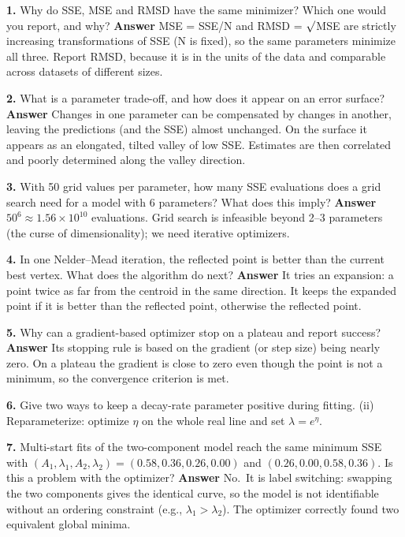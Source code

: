 \textbf{1.} Why do SSE, MSE and RMSD have the same minimizer? Which one
would you report, and why? \textbf{Answer} MSE = SSE/N and RMSD = \ensuremath{\surd}MSE
are strictly increasing transformations of SSE (N is fixed), so the same
parameters minimize all three. Report RMSD, because it is in the units
of the data and comparable across datasets of different sizes.

\textbf{2.} What is a parameter trade-off, and how does it appear on an
error surface? \textbf{Answer} Changes in one parameter can be
compensated by changes in another, leaving the predictions (and the SSE)
almost unchanged. On the surface it appears as an elongated, tilted
valley of low SSE. Estimates are then correlated and poorly determined
along the valley direction.

\textbf{3.} With 50 grid values per parameter, how many SSE evaluations
does a grid search need for a model with 6 parameters? What does this
imply? \textbf{Answer} \(50^6 \approx 1.56 \times 10^{10}\) evaluations.
Grid search is infeasible beyond 2--3 parameters (the curse of
dimensionality); we need iterative optimizers.

\textbf{4.} In one Nelder--Mead iteration, the reflected point is better
than the current best vertex. What does the algorithm do next?
\textbf{Answer} It tries an expansion: a point twice as far from the
centroid in the same direction. It keeps the expanded point if it is
better than the reflected point, otherwise the reflected point.

\textbf{5.} Why can a gradient-based optimizer stop on a plateau and
report success? \textbf{Answer} Its stopping rule is based on the
gradient (or step size) being nearly zero. On a plateau the gradient is
close to zero even though the point is not a minimum, so the convergence
criterion is met.

\textbf{6.} Give two ways to keep a decay-rate parameter positive during
fitting. (ii) Reparameterize: optimize \(\eta\) on the whole real line
and set \(\lambda = e^{\eta}\).

\textbf{7.} Multi-start fits of the two-component model reach the same
minimum SSE with
\((A_1, \lambda_1, A_2, \lambda_2) = (0.58, 0.36, 0.26, 0.00)\) and
\((0.26, 0.00, 0.58, 0.36)\). Is this a problem with the optimizer?
\textbf{Answer} No.~It is label switching: swapping the two components
gives the identical curve, so the model is not identifiable without an
ordering constraint (e.g., \(\lambda_1 > \lambda_2\)). The optimizer
correctly found two equivalent global minima.

